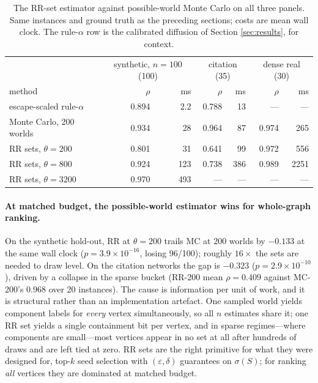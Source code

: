 \documentclass[11pt,a4paper]{article}
\begin{document}
\begin{table}[h]
\centering\small
\caption{The RR-set estimator against possible-world Monte Carlo on all three
panels. Same instances and ground truth as the preceding sections; costs are
mean wall clock. The rule-$\alpha$ row is the calibrated diffusion of Section
\ref{sec:results}, for context.}
\label{tab:rr}
\begin{tabular}{l rr rr rr}
\toprule
& \multicolumn{2}{c}{synthetic, $n{=}100$ (100)} & \multicolumn{2}{c}{citation (35)} & \multicolumn{2}{c}{dense real (30)} \\
method & $\rho$ & ms & $\rho$ & ms & $\rho$ & ms \\
\midrule
escape-scaled rule-$\alpha$ & 0.894 & 2.2 & 0.788 & 13 & --- & --- \\
Monte Carlo, 200 worlds     & 0.934 & 28  & 0.964 & 87 & 0.974 & 265 \\
RR sets, $\theta=200$       & 0.801 & 31  & 0.641 & 99 & 0.972 & 556 \\
RR sets, $\theta=800$       & 0.924 & 123 & 0.738 & 386 & 0.989 & 2251 \\
RR sets, $\theta=3200$      & 0.970 & 493 & --- & --- & --- & --- \\
\bottomrule
\end{tabular}
\end{table}

\paragraph{At matched budget, the possible-world estimator wins for
whole-graph ranking.} On the synthetic hold-out, RR at $\theta=200$ trails MC
at 200 worlds by $-0.133$ at the same wall clock ($p=3.9\times10^{-16}$,
losing 96/100); roughly $16\times$ the sets are needed to draw level. On the
citation networks the gap is $-0.323$ ($p=2.9\times10^{-10}$), driven by a
collapse in the sparse bucket (RR-200 mean $\rho=0.409$ against MC-200's
$0.968$ over 20 instances). The cause is information per unit of work, and it
is structural rather than an implementation artefact. One sampled world yields
component labels for \emph{every} vertex simultaneously, so all $n$ estimates
share it; one RR set yields a single containment bit per vertex, and in sparse
regimes---where components are small---most vertices appear in no set at all
after hundreds of draws and are left tied at zero. RR sets are the right
primitive for what they were designed for, top-$k$ seed selection with
$(\varepsilon,\delta)$ guarantees on $\sigma(S)$; for ranking \emph{all}
vertices they are dominated at matched budget.
\end{document}
